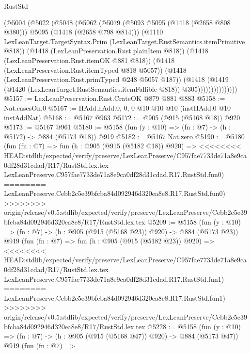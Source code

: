 \begin{lexlean}{RustStd}
\begin{coremodule}
{\begin{coremodule}
{{{{{{{{{{{{{{                      (@5004
                        (@5022
                          (@5048
                            (@5062
                              (@5079
                                (@5093 @5095 (@1418 (@2658 @808 @380)))
                                @5095
                                (@1418 (@2658 @798 @814)))
                              (@1110
                                LexLeanTarget.TargetSyntax.Prim
                                (LexLeanTarget.RustSemantics.itemPrimitive @818))
                              (@1418 (LexLeanPreservation.Rust.plainItem @818))
                              (@1418 (LexLeanPreservation.Rust.itemOK @881 @818))
                              (@1418 (LexLeanPreservation.Rust.itemTyped @818 @5057))
                              (@1418 (LexLeanPreservation.Rust.primTyped @248 @5057 @187))
                              (@1418
                                (@1419
                                  (@1420 (LexLeanTarget.RustSemantics.itemFallible @818))
                                  @305)))))))))))))))
@5157 := LexLeanPreservation.Rust.CrateOK @879 @881 @883
@5158 := Nat.casesOn.{0}
@5167 := HAdd.hAdd.{0, 0, 0} @10 @10 @10 (instHAdd.{0} @10 instAddNat)
@5168 := @5167 @963
@5172 := @905 (@915 (@5168 @18)) @920
@5173 := @5167 @961
@5180 := @5158 (fun (y : @10) => (fn : @7) -> (h : @5172) -> @884 (@5173 @18)) @919
@5182 := @5167 Nat.zero
@5190 := @5180
    (fun (fn : @7) =>
    fun (h : @905 (@915 (@5182 @18)) @920) =>
<<<<<<<< HEAD:stdlib/expected/verify/preserve/LexLeanPreserve/C957fae7733de71a8e9ca0df28d31cdad/R17/RustStd.lex.tex
    LexLeanPreserve.C957fae7733de71a8e9ca0df28d31cdad.R17.RustStd.fun0)
========
    LexLeanPreserve.Cebb2c5e39bfcba84d092946d320ea8e8.R17.RustStd.fun0)
>>>>>>>> origin/release/v0.5:stdlib/expected/verify/preserve/LexLeanPreserve/Cebb2c5e39bfcba84d092946d320ea8e8/R17/RustStd.lex.tex
@5209 := @5158
    (fun (y : @10) => (fn : @7) -> (h : @905 (@915 (@5168 @23)) @920) -> @884 (@5173 @23))
    @919
    (fun (fn : @7) =>
    fun (h : @905 (@915 (@5182 @23)) @920) =>
<<<<<<<< HEAD:stdlib/expected/verify/preserve/LexLeanPreserve/C957fae7733de71a8e9ca0df28d31cdad/R17/RustStd.lex.tex
    LexLeanPreserve.C957fae7733de71a8e9ca0df28d31cdad.R17.RustStd.fun1)
========
    LexLeanPreserve.Cebb2c5e39bfcba84d092946d320ea8e8.R17.RustStd.fun1)
>>>>>>>> origin/release/v0.5:stdlib/expected/verify/preserve/LexLeanPreserve/Cebb2c5e39bfcba84d092946d320ea8e8/R17/RustStd.lex.tex
@5228 := @5158
    (fun (y : @10) => (fn : @7) -> (h : @905 (@915 (@5168 @47)) @920) -> @884 (@5173 @47))
    @919
    (fun (fn : @7) =>
}}}}}}}}}}}}}}
\end{coremodule}}
\end{coremodule}
\end{lexlean}
